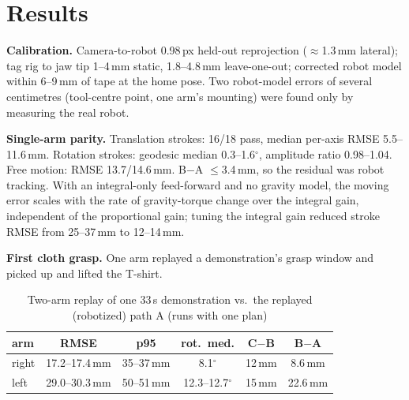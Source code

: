\documentclass[conference,10pt]{IEEEtran}
\newcommand{\mm}{\,mm\xspace}
\begin{document}
\section{Results}
\textbf{Calibration.} Camera-to-robot 0.98\,px held-out reprojection ($\approx$1.3\mm lateral); tag rig to jaw tip
1--4\mm static, 1.8--4.8\mm leave-one-out; corrected robot model within 6--9\mm of tape at the home pose. Two robot-model
errors of several centimetres (tool-centre point, one arm's mounting) were found only by measuring the real robot.

\textbf{Single-arm parity.} Translation strokes: 16/18 pass, median per-axis RMSE 5.5--11.6\mm. Rotation strokes:
geodesic median 0.3--1.6$^\circ$, amplitude ratio 0.98--1.04. Free motion: RMSE 13.7/14.6\mm. B$-$A $\le$3.4\mm, so the
residual was robot tracking. With an integral-only feed-forward and no gravity model, the moving error scales with the
rate of gravity-torque change over the integral gain, independent of the proportional gain; tuning the integral gain
reduced stroke RMSE from 25--37\mm to 12--14\mm.

\textbf{First cloth grasp.} One arm replayed a demonstration's grasp window and picked up and lifted the T-shirt.

\begin{table}[t]
\caption{Two-arm replay of one 33\,s demonstration vs.\ the replayed (robotized) path A (runs with one plan)}\label{tab:rep}
\centering\footnotesize\setlength{\tabcolsep}{4pt}
\begin{tabular}{@{}lccccc@{}}
\toprule
arm & RMSE & p95 & rot.\ med. & C$-$B & B$-$A \\
\midrule
right & 17.2--17.4\mm & 35--37\mm & 8.1$^\circ$ & 12\mm & 8.6\mm \\
left & 29.0--30.3\mm & 50--51\mm & 12.3--12.7$^\circ$ & 15\mm & 22.6\mm \\
\bottomrule
\end{tabular}
\end{table}
\end{document}
